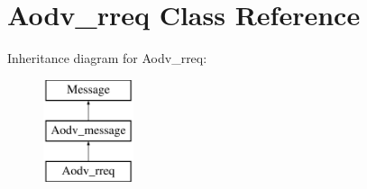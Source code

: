 \hypertarget{class_aodv__rreq}{}\section{Aodv\+\_\+rreq Class Reference}
\label{class_aodv__rreq}
Inheritance diagram for Aodv\+\_\+rreq\+:\begin{figure}[H]
\begin{center}
\leavevmode
\includegraphics[height=3.000000cm]{class_aodv__rreq}
\end{center}
\end{figure}
